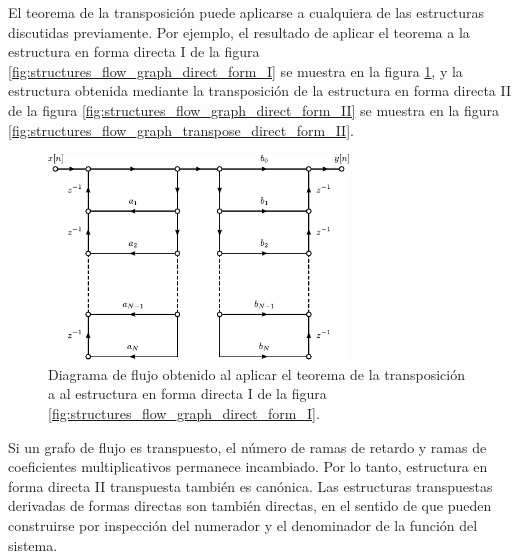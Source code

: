 \documentclass[a4paper]{report}
\begin{document}
El teorema de la transposición puede aplicarse a cualquiera de las estructuras discutidas previamente. Por ejemplo, el resultado de aplicar el teorema a la estructura en forma directa I de la figura \ref{fig:structures_flow_graph_direct_form_I} se muestra en la figura \ref{fig:structures_flow_graph_transpose_direct_form_I}, y la estructura obtenida mediante la transposición de la estructura en forma directa II de la figura \ref{fig:structures_flow_graph_direct_form_II} se muestra en la figura \ref{fig:structures_flow_graph_transpose_direct_form_II}. 
\begin{figure}[!htb]
 \begin{center}
 \includegraphics[width=0.71\textwidth]{figuras/structures_flow_graph_transpose_direct_form_I.pdf}
 \caption{\label{fig:structures_flow_graph_transpose_direct_form_I} Diagrama de flujo obtenido al aplicar el teorema de la transposición a al estructura en forma directa I de la figura \ref{fig:structures_flow_graph_direct_form_I}.}
 \end{center}
\end{figure}
Si un grafo de flujo es transpuesto, el número de ramas de retardo y ramas de coeficientes multiplicativos permanece incambiado. Por lo tanto, estructura en forma directa II transpuesta también es canónica. Las estructuras transpuestas derivadas de formas directas son también directas, en el sentido de que pueden construirse por inspección del numerador y el denominador de la función del sistema.
\end{document}
